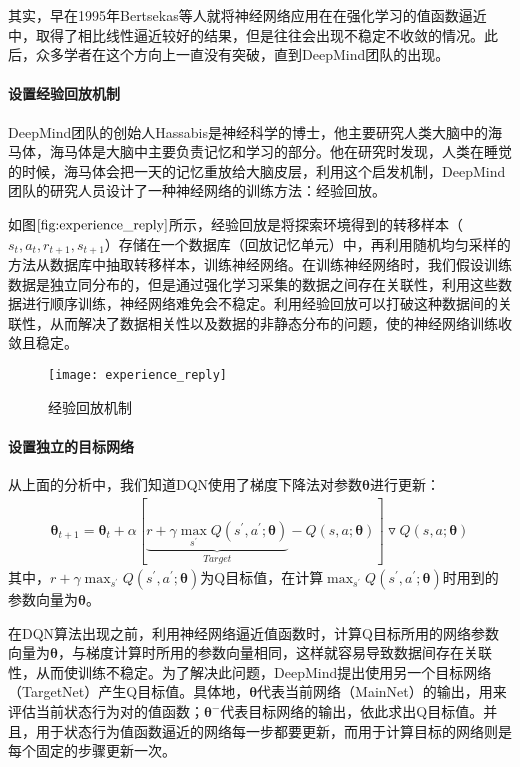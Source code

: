 其实，早在1995年Bertsekas等人就将神经网络应用在在强化学习的值函数逼近中，取得了相比线性逼近较好的结果，但是往往会出现不稳定不收敛的情况\citep{bertsekas1995neuro}。此后，众多学者在这个方向上一直没有突破，直到DeepMind团队的出现。

 \paragraph{设置经验回放机制}
DeepMind团队的创始人Hassabis是神经科学的博士，他主要研究人类大脑中的海马体，海马体是大脑中主要负责记忆和学习的部分。他在研究时发现，人类在睡觉的时候，海马体会把一天的记忆重放给大脑皮层，利用这个启发机制，DeepMind团队的研究人员设计了一种神经网络的训练方法：经验回放。

如图$\ref{fig:experience_reply}$所示，经验回放是将探索环境得到的转移样本（$s_{t}, a_{t}, r_{t+1}, s_{t+1}$）存储在一个数据库（回放记忆单元）中，再利用随机均匀采样的方法从数据库中抽取转移样本，训练神经网络。在训练神经网络时，我们假设训练数据是独立同分布的，但是通过强化学习采集的数据之间存在关联性，利用这些数据进行顺序训练，神经网络难免会不稳定。利用经验回放可以打破这种数据间的关联性，从而解决了数据相关性以及数据的非静态分布的问题，使的神经网络训练收敛且稳定。
\begin{figure}[htbp]
\centering
\texttt{[image: experience\_reply]}
\caption{经验回放机制}
\label{fig:experience_reply}
\end{figure}

 \paragraph{设置独立的目标网络}
从上面的分析中，我们知道DQN使用了梯度下降法对参数$\mathbf{\theta}$进行更新：
\begin{equation}
\begin{aligned}
\mathbf{\theta}_{t+1}=\mathbf{\theta}_{t}+\alpha[\underbrace{r+\gamma \max_{s^{'}}Q(s^{'},a^{'};\mathbf{\theta})}_{Target}-Q(s,a;\mathbf{\theta})]\triangledown Q(s,a;\mathbf{\theta})
\end{aligned}
\end{equation}
其中，$r+\gamma \max_{s^{'}}Q(s^{'},a^{'};\mathbf{\theta})$为Q目标值，在计算$\max_{s^{'}}Q(s^{'},a^{'};\mathbf{\theta})$时用到的参数向量为$\mathbf{\theta}$。

在DQN算法出现之前，利用神经网络逼近值函数时，计算Q目标所用的网络参数向量为$\mathbf{\theta}$，与梯度计算时所用的参数向量相同，这样就容易导致数据间存在关联性，从而使训练不稳定。为了解决此问题，DeepMind提出使用另一个目标网络（TargetNet）产生Q目标值。具体地，$\mathbf{\theta}$代表当前网络（MainNet）的输出，用来评估当前状态行为对的值函数；$\mathbf{\theta}^{-}$代表目标网络的输出，依此求出Q目标值。并且，用于状态行为值函数逼近的网络每一步都要更新，而用于计算目标的网络则是每个固定的步骤更新一次。

